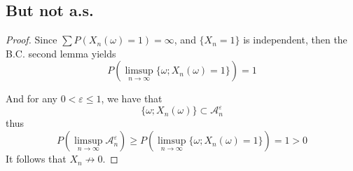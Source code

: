 \documentclass{homework}
\begin{document}
    \subsection{But not a.s.}
    \begin{proof}
        Since $\sum P(X_n(\omega)=1)=\infty$, and $\{X_n=1\}$ is
        independent,
        then the B.C. second lemma yields 
        \[P\left(\limsup_{n\to\infty}\{\omega;X_n(\omega)=1\}\right)=1\]

        And for any $0<\varepsilon\leq 1$, we have that
        \[\{\omega;X_n(\omega)\}\subset\mathcal A_n^\varepsilon\]
        thus
        \[P\left(\limsup_{n\to\infty}\mathcal A_n^\varepsilon\right)\geq
        P\left(\limsup_{n\to\infty}\{\omega;X_n(\omega)=1\}\right)=1>0\]
        It follows that 
        $X_n\not\to 0$.
    \end{proof}
\end{document}
